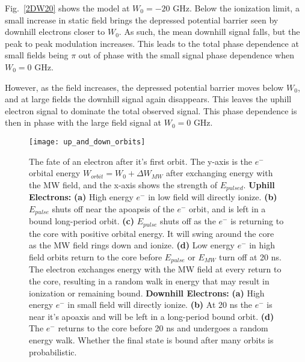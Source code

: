 \documentclass[aps,pra,preprint,groupedaddress]{revtex4-1}
\begin{document}
Fig.~\ref{2DW20} shows the model at $W_0 = -20$ GHz. Below the ionization limit, a small increase in static field brings the depressed potential barrier seen by downhill electrons closer to $W_0$. As such, the mean downhill signal falls, but the peak to peak modulation increases. This leads to the total phase dependence at small fields being $\pi$ out of phase with the small signal phase dependence when $W_0 = 0$ GHz.

However, as the field increases, the depressed potential barrier moves below $W_0$, and at large fields the downhill signal again disappears. This leaves the uphill electron signal to dominate the total observed signal. This phase dependence is then in phase with the large field signal at $W_0 = 0$ GHz.


\begin{figure}
	\texttt{[image: up\_and\_down\_orbits]}
	\caption{The fate of an electron after it's first orbit. The y-axis is the $e^-$ orbital energy $W_{orbit} = W_0 + \Delta W_{MW}$ after exchanging energy with the MW field, and the x-axis shows the strength of $E_{pulsed}$. \textbf{Uphill Electrons:} \textbf{(a)} High energy $e^-$ in low field will directly ionize. \textbf{(b)} $E_{pulse}$ shuts off near the apoapsis of the $e^-$ orbit, and is left in a bound long-period orbit. \textbf{(c)} $E_{pulse}$ shuts off as the $e^-$ is returning to the core with positive orbital energy. It will swing around the core as the MW field rings down and ionize. \textbf{(d)} Low energy $e^-$ in high field orbits return to the core before $E_{pulse}$ or $E_{MW}$ turn off at 20 ns. The electron exchanges energy with the MW field at every return to the core, resulting in a random walk in energy that may result in ionization or remaining bound. \textbf{Downhill Electrons:} \textbf{(a)} High energy $e^-$ in small field will directly ionize. \textbf{(b)} At 20 ns the $e^-$ is near it's apoaxis and will be left in a long-period bound orbit. \textbf{(d)} The $e^-$ returns to the core before 20 ns and undergoes a random energy walk. Whether the final state is bound after many orbits is probabilistic.}
	\label{fig:orbits}	
\end{figure}
\end{document}
